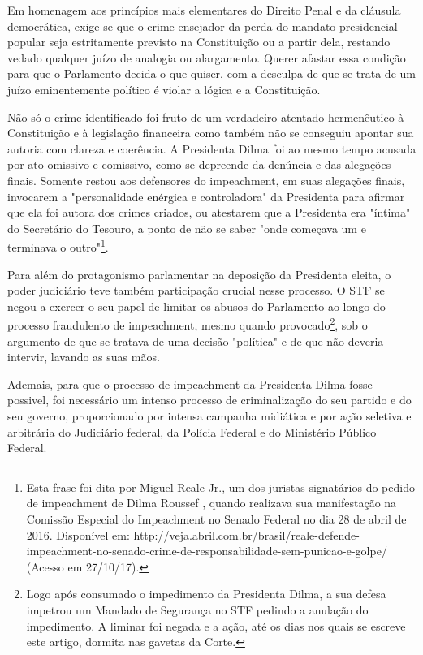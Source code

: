 Em homenagem aos princípios mais elementares do Direito Penal e da
cláusula democrática, exige-se que o crime ensejador da perda do mandato
presidencial popular seja estritamente previsto na Constituição ou a
partir dela, restando vedado qualquer juízo de analogia ou alargamento.
Querer afastar essa condição para que o Parlamento decida o que quiser,
com a desculpa de que se trata de um juízo eminentemente político é
violar a lógica e a Constituição.

Não só o crime identificado foi fruto de um verdadeiro atentado
hermenêutico à Constituição e à legislação financeira como também não se
conseguiu apontar sua autoria com clareza e coerência. A Presidenta
Dilma foi ao mesmo tempo acusada por ato omissivo e comissivo, como se
depreende da denúncia e das alegações finais. Somente restou aos
defensores do impeachment, em suas alegações finais, invocarem a
"personalidade enérgica e controladora" da Presidenta para afirmar que
ela foi autora dos crimes criados, ou atestarem que a Presidenta era
"íntima" do Secretário do Tesouro, a ponto de não se saber "onde
começava um e terminava o outro"\footnote{Esta frase foi dita por Miguel
  Reale Jr., um dos juristas signatários do pedido de impeachment de
  Dilma Roussef , quando realizava sua manifestação na Comissão Especial
  do Impeachment no Senado Federal no dia 28 de abril de 2016.
  Disponível em:
  http://veja.abril.com.br/brasil/reale-defende-impeachment-no-senado-crime-de-responsabilidade-sem-punicao-e-golpe/
  (Acesso em 27/10/17).}.

Para além do protagonismo parlamentar na deposição da Presidenta eleita,
o poder judiciário teve também participação crucial nesse processo. O
STF se negou a exercer o seu papel de limitar os abusos do Parlamento ao
longo do processo fraudulento de impeachment, mesmo quando
provocado\footnote{Logo após consumado o impedimento da Presidenta
  Dilma, a sua defesa impetrou um Mandado de Segurança no STF pedindo a
  anulação do impedimento. A liminar foi negada e a ação, até os dias
  nos quais se escreve este artigo, dormita nas gavetas da Corte.}, sob
o argumento de que se tratava de uma decisão "política" e de que não
deveria intervir, lavando as suas mãos.

Ademais, para que o processo de impeachment da Presidenta Dilma fosse
possivel, foi necessário um intenso processo de criminalização do seu
partido e do seu governo, proporcionado por intensa campanha midiática e
por ação seletiva e arbitrária do Judiciário federal, da Polícia Federal
e do Ministério Público Federal.

